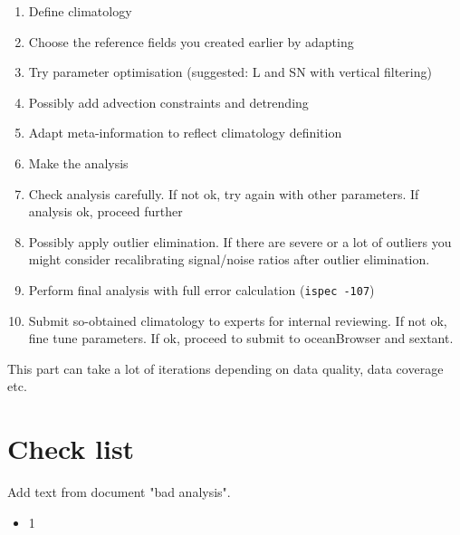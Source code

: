 \documentclass[a4paper,12pt,oneside,notitlepage]{book}
\newcommand{\file}[1]{\texttt{\color{MidnightBlue}{#1}}}
\newcommand{\command}[1]{\texttt{\color{RedOrange}{#1}}}
\begin{document}
\begin{enumerate}
\item Define climatology \file{yearlist, monthlist, varlist}
\item Choose the reference fields you created earlier by adapting \command{constandrefe}
\item Try parameter optimisation (suggested: L and SN with vertical filtering)
\item Possibly add advection constraints and detrending
\item Adapt meta-information to reflect climatology definition
\item Make the analysis
\item Check analysis carefully. If not ok, try again with other parameters. If analysis ok, proceed further
\item Possibly apply outlier elimination. If there are severe or a lot of outliers you might consider recalibrating signal/noise ratios after outlier elimination.

\item Perform final analysis with full error calculation ({\tt ispec -107})
\item Submit so-obtained climatology to experts for internal reviewing. If not ok, fine tune parameters. If ok, proceed to submit to oceanBrowser and sextant.
\end{enumerate}


This part can take a lot of iterations depending on data quality, data coverage etc.


\section{Check list}

Add text from document "bad analysis".

\begin{itemize}
\item[\checkmark] 1
\end{itemize}





\end{document}
